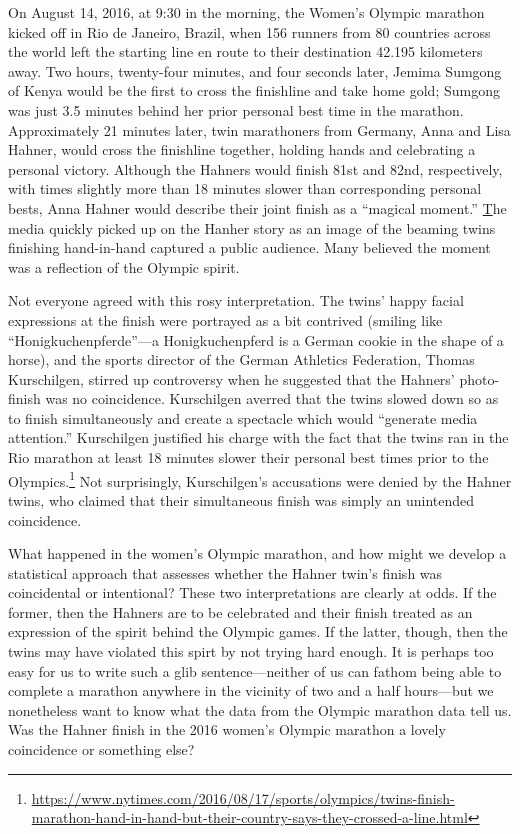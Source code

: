 \documentclass[12pt,titlepage]{article}
\begin{document}
On August 14, 2016, at 9:30 in the morning, the Women's Olympic
marathon kicked off in Rio de Janeiro, Brazil, when 156 runners from
80 countries across the world left the starting line en route to their
destination 42.195 kilometers away. Two hours, twenty-four minutes,
and four seconds later, Jemima Sumgong of Kenya would be the first to
cross the finishline and take home gold; Sumgong was just 3.5 minutes
behind her prior personal best time in the marathon. Approximately 21
minutes later, twin marathoners from Germany, Anna and Lisa Hahner,
would cross the finishline together, holding hands and celebrating a
personal victory. Although the Hahners would finish 81st and 82nd,
respectively, with times slightly more than 18 minutes slower than
corresponding personal bests, Anna Hahner would describe their joint
finish as a ``magical moment.''
\href{https://www.nytimes.com/2016/08/17/sports/olympics/twins-finish-marathon-hand-in-hand-but-their-country-says-they-crossed-a-line.html}
The media quickly picked up on the Hanher story as an image of the
beaming twins finishing hand-in-hand captured a public audience. Many
believed the moment was a reflection of the Olympic spirit.

Not everyone agreed with this rosy interpretation. The twins' happy
facial expressions at the finish were portrayed as a bit contrived
(smiling like ``Honigkuchenpferde''---a Honigkuchenpferd is a German
cookie in the shape of a horse), and the sports director of the German
Athletics Federation, Thomas Kurschilgen, stirred up controversy when
he suggested that the Hahners' photo-finish was no coincidence.
Kurschilgen averred that the twins slowed down so as to finish
simultaneously and create a spectacle which would ``generate media
attention.'' Kurschilgen justified his charge with the fact that the
twins ran in the Rio marathon at least 18 minutes slower their
personal best times prior to the
Olympics.\footnote{\url{https://www.nytimes.com/2016/08/17/sports/olympics/twins-finish-marathon-hand-in-hand-but-their-country-says-they-crossed-a-line.html}}
Not surprisingly, Kurschilgen's accusations were denied by the Hahner
twins, who claimed that their simultaneous finish was simply an
unintended coincidence.




What happened in the women's Olympic marathon, and how might we
develop a statistical approach that assesses whether the Hahner twin's
finish was coincidental or intentional?  These two interpretations are
clearly at odds. If the former, then the Hahners are to be celebrated
and their finish treated as an expression of the spirit behind the
Olympic games. If the latter, though, then the twins may have violated
this spirt by not trying hard enough. It is perhaps too easy for us to
write such a glib sentence---neither of us can fathom being able to
complete a marathon anywhere in the vicinity of two and a half
hours---but we nonetheless want to know what the data from the Olympic
marathon data tell us.  Was the Hahner finish in the 2016 women's
Olympic marathon a lovely coincidence or something else?
\end{document}
